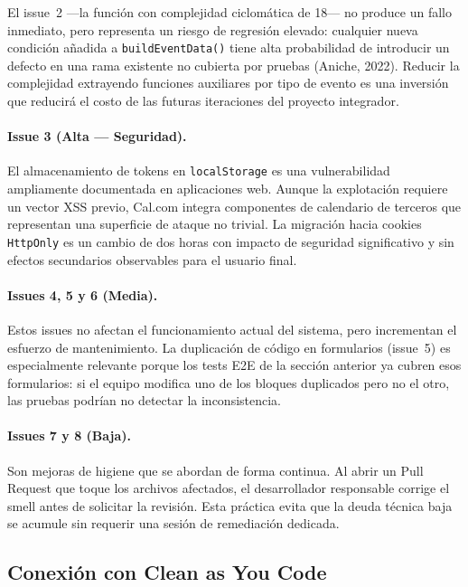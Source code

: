 \documentclass[12pt,letterpaper]{article}
\begin{document}
El issue~2 ---la función con complejidad ciclomática de 18--- no produce un fallo
inmediato, pero representa un riesgo de regresión elevado: cualquier nueva condición
añadida a \texttt{buildEventData()} tiene alta probabilidad de introducir un defecto
en una rama existente no cubierta por pruebas (Aniche, 2022). Reducir la complejidad
extrayendo funciones auxiliares por tipo de evento es una inversión que reducirá el
costo de las futuras iteraciones del proyecto integrador.

\paragraph{Issue 3 (Alta --- Seguridad).}
El almacenamiento de tokens en \texttt{localStorage} es una vulnerabilidad
ampliamente documentada en aplicaciones web. Aunque la explotación requiere un
vector XSS previo, Cal.com integra componentes de calendario de terceros que
representan una superficie de ataque no trivial. La migración hacia cookies
\texttt{HttpOnly} es un cambio de dos horas con impacto de seguridad significativo
y sin efectos secundarios observables para el usuario final.

\paragraph{Issues 4, 5 y 6 (Media).}
Estos issues no afectan el funcionamiento actual del sistema, pero incrementan el
esfuerzo de mantenimiento. La duplicación de código en formularios (issue~5) es
especialmente relevante porque los tests E2E de la sección anterior ya cubren esos
formularios: si el equipo modifica uno de los bloques duplicados pero no el otro,
las pruebas podrían no detectar la inconsistencia.

\paragraph{Issues 7 y 8 (Baja).}
Son mejoras de higiene que se abordan de forma continua. Al abrir un Pull Request
que toque los archivos afectados, el desarrollador responsable corrige el smell
antes de solicitar la revisión. Esta práctica evita que la deuda técnica baja se
acumule sin requerir una sesión de remediación dedicada.

\subsection{Conexión con Clean as You Code}
\end{document}
